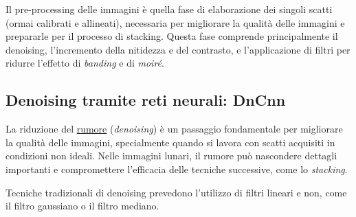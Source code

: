 Il pre-processing delle immagini è quella fase di elaborazione dei singoli scatti (ormai calibrati e allineati), necessaria per migliorare la qualità delle immagini e prepararle per il processo di stacking. Questa fase comprende principalmente il denoising, l'incremento della nitidezza e del contrasto, e l'applicazione di filtri per ridurre l'effetto di \textit{banding} e di \textit{moiré}.

\subsection{Denoising tramite reti neurali: DnCnn} \label{subsec:denoising}

La riduzione del \hyperref[sec:noise]{rumore} (\textit{denoising}) è un passaggio fondamentale per migliorare la qualità delle immagini, specialmente quando si lavora con scatti acquisiti in condizioni non ideali. Nelle immagini lunari, il rumore può nascondere dettagli importanti e compromettere l'efficacia delle tecniche successive, come lo \textit{stacking}.

Tecniche tradizionali di denoising prevedono l'utilizzo di filtri lineari e non, come il filtro gaussiano o il filtro mediano.

